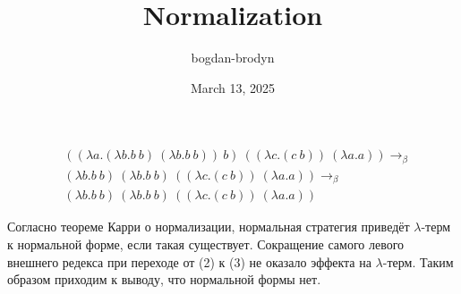 \documentclass{article}
\title{Normalization}
\author{bogdan-brodyn}
\date{March 13, 2025}
\begin{document}
\maketitle
\thispagestyle{empty}

\begin{align}
&((\lambda a.(\lambda b.b\ b)\ (\lambda b.b\ b))\ b)\ ((\lambda c.(c\ b))\ (\lambda a.a)) \rightarrow_\beta \\
&(\lambda b.b\ b)\ (\lambda b.b\ b)\ ((\lambda c.(c\ b))\ (\lambda a.a)) \rightarrow_\beta \\
&(\lambda b.b\ b)\ (\lambda b.b\ b)\ ((\lambda c.(c\ b))\ (\lambda a.a))
\end{align}

Согласно теореме Карри о нормализации, нормальная стратегия приведёт $\lambda$-терм к нормальной форме, если такая существует. Сокращение самого левого внешнего редекса при переходе от (2) к (3) не оказало эффекта на $\lambda$-терм. Таким образом приходим к выводу, что нормальной формы нет.
\end{document}
